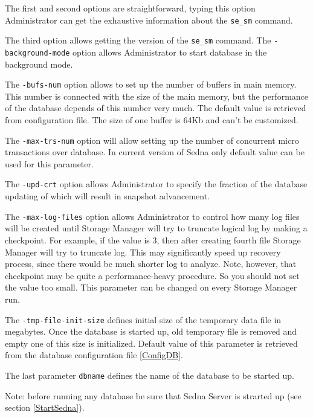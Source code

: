 \documentclass[a4paper,12pt]{article}
\begin{document}
The first and second options are straightforward, typing this option
Administrator can get the exhaustive information about the \verb!se_sm! command.

The third option allows getting the version of the \verb!se_sm! command. The
\verb!-background-mode! option allows Administrator to start database in the
background mode.

The \verb!-bufs-num! option allows to set up the number of buffers in main
memory. This number is connected with the size of the main memory, but the
performance of the database depends of this number very much. The default value
is retrieved from configuration file. The size of one buffer is 64Kb and can't
be customized.

The \verb!-max-trs-num! option will allow setting up the number of concurrent
micro transactions over database. In current version of Sedna only default value
can be used for this parameter.

The \verb!-upd-crt! option allows Administrator to specify the fraction of the
database updating of which will result in snapshot advancement.

The \verb!-max-log-files! option allows Administrator to control how many log
files will be created until Storage Manager will try to truncate logical log by
making a checkpoint. For example, if the value is 3, then after creating
fourth file Storage Manager will try to truncate log. This may significantly
speed up recovery process, since there would be much shorter log to analyze.
Note, however, that checkpoint may be quite a performance-heavy procedure. So
you should not set the value too small. This parameter can be changed on every
Storage Manager run.

The \verb!-tmp-file-init-size! defines initial size of the temporary data file
in megabytes. Once the database is started up, old temporary file is removed and
empty one of this size is initialized. Default value of this parameter is
retrieved from the database configuration file \ref{ConfigDB}.

The last parameter \verb!dbname! defines the name of the database to be started
up.

Note: before running any database be sure that Sedna Server is strarted up (see
section \ref{StartSedna}).


\end{document}
